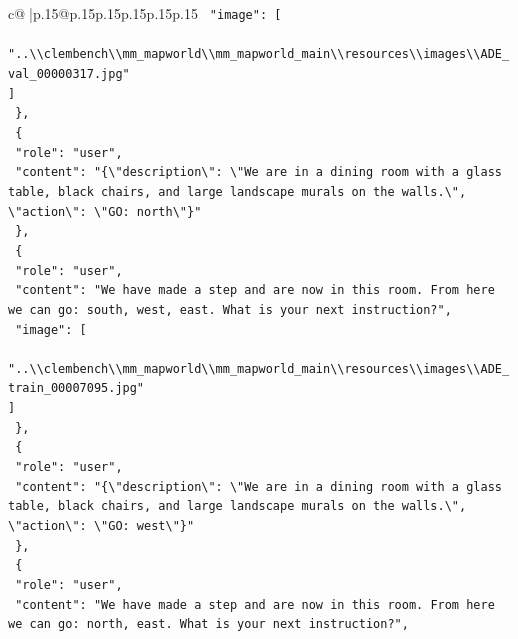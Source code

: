 \documentclass{article}
\begin{document}
{\begin{supertabular}{c@{$\;$}|p{.15\linewidth}@{}p{.15\linewidth}p{.15\linewidth}p{.15\linewidth}p{.15\linewidth}p{.15\linewidth}}
{{{\texttt{    "image": {[}} \\
\texttt{      "..\textbackslash{}\textbackslash{}clembench\textbackslash{}\textbackslash{}mm\_mapworld\textbackslash{}\textbackslash{}mm\_mapworld\_main\textbackslash{}\textbackslash{}resources\textbackslash{}\textbackslash{}images\textbackslash{}\textbackslash{}ADE\_val\_00000317.jpg"} \\
\texttt{    {]}} \\
\texttt{  \},} \\
\texttt{  \{} \\
\texttt{    "role": "user",} \\
\texttt{    "content": "\{\textbackslash{}"description\textbackslash{}": \textbackslash{}"We are in a dining room with a glass table, black chairs, and large landscape murals on the walls.\textbackslash{}", \textbackslash{}"action\textbackslash{}": \textbackslash{}"GO: north\textbackslash{}"\}"} \\
\texttt{  \},} \\
\texttt{  \{} \\
\texttt{    "role": "user",} \\
\texttt{    "content": "We have made a step and are now in this room. From here we can go: south, west, east. What is your next instruction?",} \\
\texttt{    "image": {[}} \\
\texttt{      "..\textbackslash{}\textbackslash{}clembench\textbackslash{}\textbackslash{}mm\_mapworld\textbackslash{}\textbackslash{}mm\_mapworld\_main\textbackslash{}\textbackslash{}resources\textbackslash{}\textbackslash{}images\textbackslash{}\textbackslash{}ADE\_train\_00007095.jpg"} \\
\texttt{    {]}} \\
\texttt{  \},} \\
\texttt{  \{} \\
\texttt{    "role": "user",} \\
\texttt{    "content": "\{\textbackslash{}"description\textbackslash{}": \textbackslash{}"We are in a dining room with a glass table, black chairs, and large landscape murals on the walls.\textbackslash{}", \textbackslash{}"action\textbackslash{}": \textbackslash{}"GO: west\textbackslash{}"\}"} \\
\texttt{  \},} \\
\texttt{  \{} \\
\texttt{    "role": "user",} \\
\texttt{    "content": "We have made a step and are now in this room. From here we can go: north, east. What is your next instruction?",} \\
}}}
\end{supertabular}}
\end{document}
